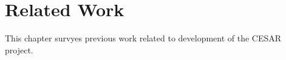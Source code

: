 \chapter{Related Work}
This chapter survyes previous work related to development of the CESAR project. 







